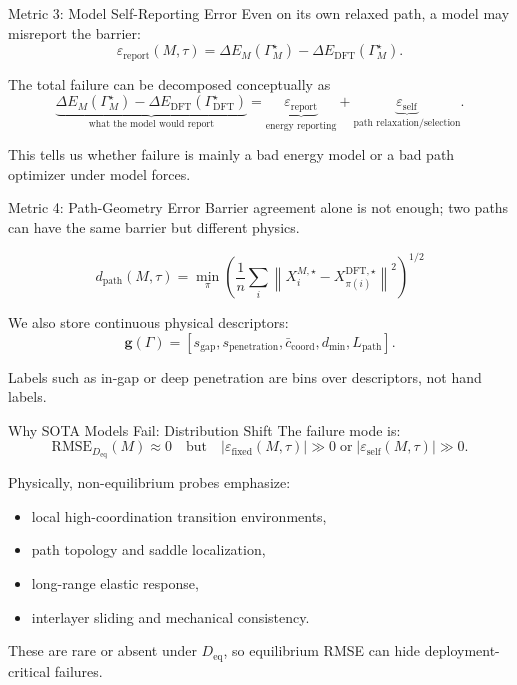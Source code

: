 \documentclass[aspectratio=169,10pt]{beamer}
\newcommand{\Deq}{D_{\mathrm{eq}}}
\newcommand{\Gdft}{\Gamma_{\mathrm{DFT}}^\star}
\newcommand{\GM}{\Gamma_M^\star}
\newcommand{\epsfixed}{\varepsilon_{\mathrm{fixed}}}
\newcommand{\epsself}{\varepsilon_{\mathrm{self}}}
\newcommand{\epsreport}{\varepsilon_{\mathrm{report}}}
\newcommand{\dpath}{d_{\mathrm{path}}}
\begin{document}
\begin{frame}{Metric 3: Model Self-Reporting Error}
  Even on its own relaxed path, a model may misreport the barrier:
  \[
  \epsreport(M,\tau)
  =
  \Delta E_M(\GM)
  -
  \Delta E_{\mathrm{DFT}}(\GM).
  \]

  \vspace{0.25cm}
  The total failure can be decomposed conceptually as
  \[
  \underbrace{\Delta E_M(\GM)-\Delta E_{\mathrm{DFT}}(\Gdft)}_{\text{what the model would report}}
  =
  \underbrace{\epsreport}_{\text{energy reporting}}
  +
  \underbrace{\epsself}_{\text{path relaxation/selection}}.
  \]

  \vspace{0.2cm}
  This tells us whether failure is mainly a bad energy model or a bad path optimizer under model forces.
\end{frame}

\begin{frame}{Metric 4: Path-Geometry Error}
  Barrier agreement alone is not enough; two paths can have the same barrier but different physics.

  \[
  \dpath(M,\tau)
  =
  \min_{\pi}
  \left(
  \frac{1}{n}\sum_i
  \left\|
  X_i^{M,\star}-X_{\pi(i)}^{\mathrm{DFT},\star}
  \right\|^2
  \right)^{1/2}
  \]

  \vspace{0.15cm}
  We also store continuous physical descriptors:
  \[
  \bm{g}(\Gamma)
  =
  \left[
    s_{\mathrm{gap}},
    s_{\mathrm{penetration}},
    \bar{c}_{\mathrm{coord}},
    d_{\min},
    L_{\mathrm{path}}
  \right].
  \]

  \vspace{0.15cm}
  Labels such as in-gap or deep penetration are bins over descriptors, not hand labels.
\end{frame}

\begin{frame}{Why SOTA Models Fail: Distribution Shift}
  The failure mode is:
  \[
  \mathrm{RMSE}_{\Deq}(M) \approx 0
  \quad\text{but}\quad
  |\epsfixed(M,\tau)| \gg 0
  \;\text{or}\;
  |\epsself(M,\tau)| \gg 0.
  \]

  \vspace{0.25cm}
  Physically, non-equilibrium probes emphasize:
  \begin{itemize}
    \item local high-coordination transition environments,
    \item path topology and saddle localization,
    \item long-range elastic response,
    \item interlayer sliding and mechanical consistency.
  \end{itemize}

  \vspace{0.2cm}
  These are rare or absent under $\Deq$, so equilibrium RMSE can hide deployment-critical failures.
\end{frame}
\end{document}
